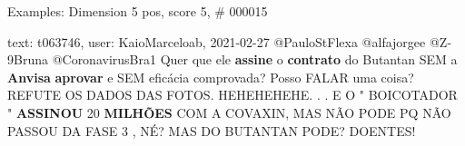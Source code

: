 \begin{frame}{Examples: Dimension 5 pos, score 5, \# 000015}
\footnotesize
\begin{exampleblock}{text: t063746, user: KaioMarceloab, 2021-02-27}
@PauloStFlexa @alfajorgee @Z-9Bruna @CoronavirusBra1 Quer que ele 
\textbf{assine} o \textbf{contrato} do Butantan SEM a \textbf{Anvisa} 
\textbf{aprovar} e SEM eficácia comprovada? Posso FALAR uma coisa? REFUTE OS 
DADOS DAS FOTOS. HEHEHEHEHE. . . E O " BOICOTADOR " \textbf{ASSINOU} 20 
\textbf{MILHÕES} COM A COVAXIN, MAS NÃO PODE PQ NÃO PASSOU DA FASE 3 , NÉ? MAS 
DO BUTANTAN PODE? DOENTES! 
\end{exampleblock}
\end{frame}
